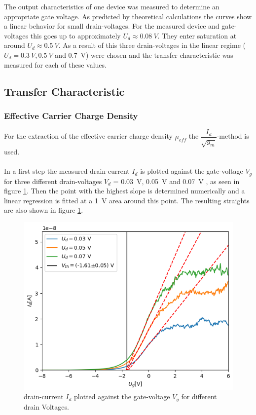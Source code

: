 \documentclass[%
 reprint,
amsmath,amssymb,
pra,
]{revtex4-1}
\begin{document}
The output characteristics of one device was measured to determine an appropriate gate voltage. As predicted by theoretical calculations the curves show a linear behavior for small drain-voltages. For the measured device and gate-voltages this goes up to approximately $U_d \approx \SI{0.08}{V}$. They enter saturation at around $U_d \approx \SI{0.5}{V}$. As a result of this three drain-voltages in the linear regime ($U_d = \SI{0.3}{V},\SI{0.5}{V} $ and \SI{0.7}{V}) were chosen and the transfer-characteristic was measured for each of these values.

\subsection{Transfer Characteristic}
\subsubsection{Effective Carrier Charge Density}
For the extraction of the effective carrier charge density $\mu_{eff}$ the $\dfrac{I_d}{\sqrt{g_m}}$-method is used.\\
\\
In a first step the measured drain-current $I_d$ is plotted against the gate-voltage $V_g$ for three different drain-voltages $V_d$ = \SI{0.03}{V}, \SI{0.05}{V} and \SI{0.07}{V} , as seen in figure \ref{fig:linreg1}. Then the point with the highest slope is determined numerically and a linear regression is fitted at a \SI{1}{\volt} area around this point. The resulting straights are also shown in figure \ref{fig:linreg1}.
\begin{figure}
\centering
\includegraphics[scale=0.6]{Bilder/linreg.png}
\caption{drain-current $I_d$ plotted against the gate-voltage $V_g$ for different drain Voltages.}
\label{fig:linreg1}
\end{figure}
\end{document}
